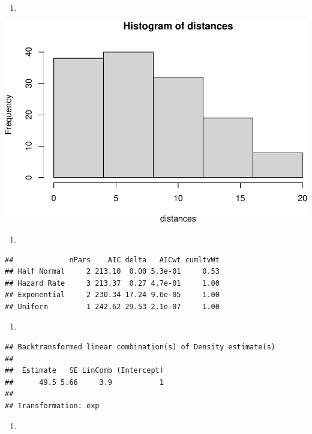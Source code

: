 \documentclass[
]{article}
\providecommand{\tightlist}{%
  \setlength{\itemsep}{0pt}\setlength{\parskip}{0pt}}
\begin{document}
\begin{enumerate}
\def\labelenumi{\arabic{enumi}.}
\setcounter{enumi}{7}
\tightlist
\item
\end{enumerate}

\includegraphics{Module5_Assignment1_AnswerKey_files/figure-latex/unnamed-chunk-9-1.pdf}

\begin{enumerate}
\def\labelenumi{\arabic{enumi}.}
\setcounter{enumi}{9}
\tightlist
\item
\end{enumerate}

\begin{verbatim}
##             nPars    AIC delta   AICwt cumltvWt
## Half Normal     2 213.10  0.00 5.3e-01     0.53
## Hazard Rate     3 213.37  0.27 4.7e-01     1.00
## Exponential     2 230.34 17.24 9.6e-05     1.00
## Uniform         1 242.62 29.53 2.1e-07     1.00
\end{verbatim}

\begin{enumerate}
\def\labelenumi{\arabic{enumi}.}
\setcounter{enumi}{11}
\tightlist
\item
\end{enumerate}

\begin{verbatim}
## Backtransformed linear combination(s) of Density estimate(s)
## 
##  Estimate   SE LinComb (Intercept)
##      49.5 5.66     3.9           1
## 
## Transformation: exp
\end{verbatim}

\begin{enumerate}
\def\labelenumi{\arabic{enumi}.}
\setcounter{enumi}{12}
\tightlist
\item
\end{enumerate}
\end{document}
